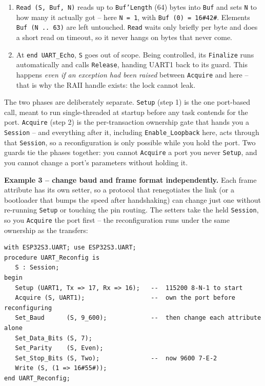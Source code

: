 \begin{enumerate}
\item \texttt{Read (S, Buf, N)} reads up to \texttt{Buf'Length} (64) bytes into
  \texttt{Buf} and sets \texttt{N} to how many it actually got -- here
  \texttt{N = 1}, with \texttt{Buf (0) = 16\#42\#}. Elements
  \texttt{Buf (N .. 63)} are left untouched. \texttt{Read} waits only briefly
  per byte and does a short read on timeout, so it never hangs on bytes that
  never come.
\item At \texttt{end UART\_Echo}, \texttt{S} goes out of scope. Being controlled,
  its \texttt{Finalize} runs automatically and calls \texttt{Release}, handing
  UART1 back to its guard. This happens \emph{even if an exception had been
  raised} between \texttt{Acquire} and here -- that is why the RAII handle
  exists: the lock cannot leak.
\end{enumerate}

The two phases are deliberately separate. \texttt{Setup} (step 1) is the one
port-based call, meant to run single-threaded at startup before any task
contends for the port. \texttt{Acquire} (step 2) is the per-transaction
ownership gate that hands you a \texttt{Session} -- and everything after it,
including \texttt{Enable\_Loopback} here, acts through that \texttt{Session}, so
a reconfiguration is only possible while you hold the port. Two guards tie the
phases together: you cannot \texttt{Acquire} a port you never \texttt{Setup}, and
you cannot change a port's parameters without holding it.

\textbf{Example 3 -- change baud and frame format independently.} Each frame
attribute has its own setter, so a protocol that renegotiates the link (or a
bootloader that bumps the speed after handshaking) can change just one without
re-running \texttt{Setup} or touching the pin routing. The setters take the held
\texttt{Session}, so you \texttt{Acquire} the port first -- the reconfiguration
runs under the same ownership as the transfers:
\begin{lstlisting}
with ESP32S3.UART; use ESP32S3.UART;
procedure UART_Reconfig is
   S : Session;
begin
   Setup (UART1, Tx => 17, Rx => 16);   --  115200 8-N-1 to start
   Acquire (S, UART1);                  --  own the port before reconfiguring
   Set_Baud      (S, 9_600);            --  then change each attribute alone
   Set_Data_Bits (S, 7);
   Set_Parity    (S, Even);
   Set_Stop_Bits (S, Two);              --  now 9600 7-E-2
   Write (S, (1 => 16#55#));
end UART_Reconfig;
\end{lstlisting}
